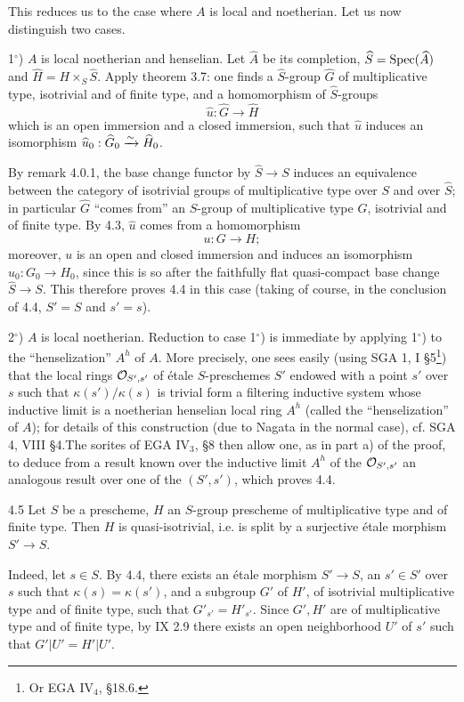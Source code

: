 This reduces us to the case where $A$ is local and noetherian. Let us now distinguish two cases.

1$^\circ$) $A$ is local noetherian and henselian. Let $\widehat A$ be its completion, $\widehat S=\operatorname{Spec}(\widehat A)$ and $\widehat H=H\times_S\widehat S$. Apply theorem 3.7: one finds a $\widehat S$-group $\widehat G$ of multiplicative type, isotrivial and of finite type, and a homomorphism of $\widehat S$-groups
\[
\widehat u:\widehat G\to\widehat H
\]
which is an open immersion and a closed immersion, such that $\widehat u$ induces an isomorphism $\widehat u_0:\widehat G_0\xrightarrow{\sim}\widehat H_0$.

By remark 4.0.1, the base change functor by $\widehat S\to S$ induces an equivalence between the category of isotrivial groups of multiplicative type over $S$ and over $\widehat S$; in particular $\widehat G$ ``comes from'' an $S$-group of multiplicative type $G$, isotrivial and of finite type. By 4.3, $\widehat u$ comes from a homomorphism
\[
u:G\to H;
\]
moreover, $u$ is an open and closed immersion and induces an isomorphism $u_0:G_0\to H_0$, since this is so after the faithfully flat quasi-compact base change $\widehat S\to S$. This therefore proves 4.4 in this case (taking of course, in the conclusion of 4.4, $S'=S$ and $s'=s$).

2$^\circ$) $A$ is local noetherian. Reduction to case 1$^\circ$) is immediate by applying 1$^\circ$) to the ``henselization'' $A^h$ of $A$. More precisely, one sees easily (using SGA 1, I \S5\footnote{Or EGA IV$_4$, \S18.6.}) that the local rings $\mathcal{O}_{S',s'}$ of étale $S$-preschemes $S'$ endowed with a point $s'$ over $s$ such that $\kappa(s')/\kappa(s)$ is trivial form a filtering inductive system whose inductive limit is a noetherian henselian local ring $A^h$ (called the ``henselization'' of $A$); for details of this construction (due to Nagata in the normal case), cf. SGA 4, VIII \S4.\footnotemark[\value{footnote}] The sorites of EGA IV$_3$, \S8 then allow one, as in part a) of the proof, to deduce from a result known over the inductive limit $A^h$ of the $\mathcal{O}_{S',s'}$ an analogous result over one of the $(S',s')$, which proves 4.4.
\begin{corollary}{4.5}\label{X.4.5}
Let $S$ be a prescheme, $H$ an $S$-group prescheme of multiplicative type and of finite type. Then $H$ is quasi-isotrivial, i.e. is split by a surjective étale morphism $S'\to S$.
\end{corollary}
Indeed, let $s\in S$. By 4.4, there exists an étale morphism $S'\to S$, an $s'\in S'$ over $s$ such that $\kappa(s)=\kappa(s')$, and a subgroup $G'$ of $H'$, of isotrivial multiplicative type and of finite type, such that $G'_{s'}=H'_{s'}$. Since $G',H'$ are of multiplicative type and of finite type, by IX 2.9 there exists an open neighborhood $U'$ of $s'$ such that $G'|U'=H'|U'$.


